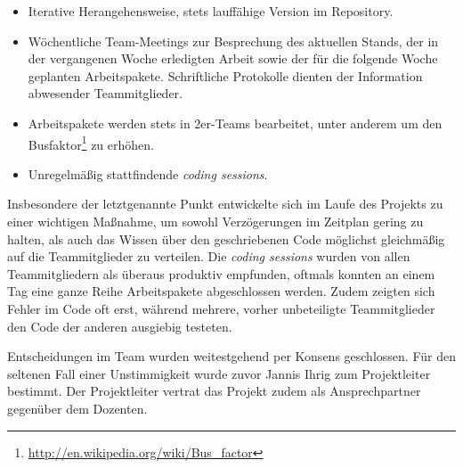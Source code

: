     \begin{itemize}
      \item Iterative Herangehensweise, stets lauffähige Version im Repository.
      \item Wöchentliche Team-Meetings zur Besprechung des aktuellen Stands, 
            der in der vergangenen Woche erledigten Arbeit sowie der für die 
            folgende Woche geplanten Arbeitspakete. Schriftliche Protokolle 
            dienten der Information abwesender Teammitglieder.
      \item Arbeitspakete werden stets in 2er-Teams bearbeitet, 
            unter anderem um den Busfaktor\footnote{\url{http://en.wikipedia.org/wiki/Bus_factor}} zu erhöhen.
      \item Unregelmäßig stattfindende \emph{coding sessions}.
    \end{itemize}

    Insbesondere der letztgenannte Punkt entwickelte sich im Laufe des Projekts
    zu einer wichtigen Maßnahme, um sowohl Verzögerungen im Zeitplan gering zu
    halten, als auch das Wissen über den geschriebenen Code möglichst
    gleichmäßig auf die Teammitglieder zu verteilen. Die \emph{coding sessions}
    wurden von allen Teammitgliedern als überaus produktiv empfunden, oftmals
    konnten an einem Tag eine ganze Reihe Arbeitspakete abgeschlossen werden.
    Zudem zeigten sich Fehler im Code oft erst, während mehrere, vorher
    unbeteiligte Teammitglieder den Code der anderen ausgiebig testeten.

    Entscheidungen im Team wurden weitestgehend per Konsens geschlossen. Für den
    seltenen Fall einer Unstimmigkeit wurde zuvor Jannis Ihrig zum Projektleiter
    bestimmt. Der Projektleiter vertrat das Projekt zudem als Ansprechpartner
    gegenüber dem Dozenten.
